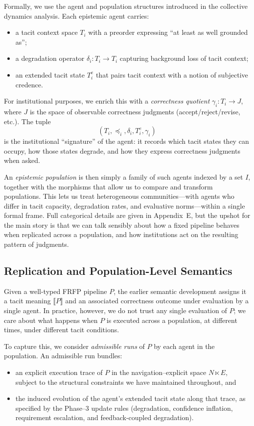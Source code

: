 \documentclass[11pt]{article}
\theoremstyle{definition}
\newcommand{\sem}[1]{\llbracket #1 \rrbracket}
\begin{document}
Formally, we use the agent and population structures introduced in the collective dynamics analysis. Each epistemic agent carries:
\begin{itemize}
  \item a tacit context space $T_i$ with a preorder expressing ``at least as well grounded as'';
  \item a degradation operator $\delta_i : T_i \to T_i$ capturing background loss of tacit context;
  \item an extended tacit state $T^e_i$ that pairs tacit context with a notion of subjective credence.
\end{itemize}
For institutional purposes, we enrich this with a \emph{correctness quotient} $\gamma_i : T_i \to J$, where $J$ is the space of observable correctness judgments (accept/reject/revise, etc.). The tuple
\[
  (T_i, \preceq_i, \delta_i, T^e_i, \gamma_i)
\]
is the institutional ``signature'' of the agent: it records which tacit states they can occupy, how those states degrade, and how they express correctness judgments when asked.

An \emph{epistemic population} is then simply a family of such agents indexed by a set $I$, together with the morphisms that allow us to compare and transform populations. This lets us treat heterogeneous communities---with agents who differ in tacit capacity, degradation rates, and evaluative norms---within a single formal frame. Full categorical details are given in Appendix~E, but the upshot for the main story is that we can talk sensibly about how a fixed pipeline behaves when replicated across a population, and how institutions act on the resulting pattern of judgments.

\subsection{Replication and Population-Level Semantics}

Given a well-typed FRFP pipeline $P$, the earlier semantic development assigns it a tacit meaning $\sem{P}$ and an associated correctness outcome under evaluation by a single agent. In practice, however, we do not trust any single evaluation of $P$; we care about what happens when $P$ is executed across a population, at different times, under different tacit conditions.

To capture this, we consider \emph{admissible runs} of $P$ by each agent in the population. An admissible run bundles:
\begin{itemize}
  \item an explicit execution trace of $P$ in the navigation--explicit space $N \ltimes E$, subject to the structural constraints we have maintained throughout, and
  \item the induced evolution of the agent's extended tacit state along that trace, as specified by the Phase--3 update rules (degradation, confidence inflation, requirement escalation, and feedback-coupled degradation).
\end{itemize}
\end{document}
